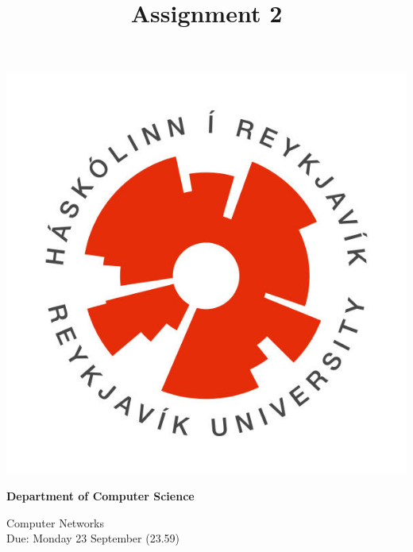 \documentclass[9pt, addpoints]{exam}
\title{Assignment 2}
\begin{document}
\noindent
\begin{minipage}[l]{.11\textwidth}%
\noindent
    \includegraphics[width=\textwidth]{HR}
\end{minipage}%
\begin{minipage}[r]{.6\textwidth}%
\begin{center}
    {\large\bfseries Department of Computer Science \par
    \large Computer Networks \\[2pt]
    \large Due: Monday 23 September (23.59)
    }
\end{center}
\end{minipage}%
%
\end{document}
